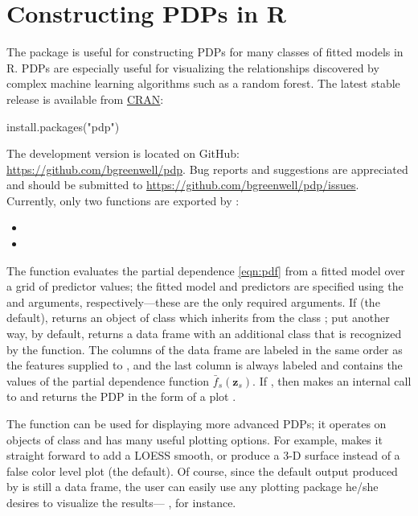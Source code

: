 \section{Constructing PDPs in R}
\label{sec:boston}

The  package is useful for constructing PDPs for many classes of fitted models in R. PDPs are especially useful for visualizing the relationships discovered by complex machine learning algorithms such as a random forest. The latest stable release is available from \href{https://cran.r-project.org/package=pdp}{CRAN}:
\begin{example}
install.packages("pdp")
\end{example}
The development version is located on GitHub: \url{https://github.com/bgreenwell/pdp}. Bug reports and suggestions are appreciated and should be submitted to \url{https://github.com/bgreenwell/pdp/issues}. Currently, only two functions are exported by :
\begin{itemize}
  \item {}
  \item {}
\end{itemize}

The  function evaluates the partial dependence \eqref{eqn:pdf} from a fitted model over a grid of predictor values; the fitted model and predictors are specified using the  and  arguments, respectively---these are the only required arguments. If  (the default),  returns an object of class  which inherits from the class ; put another way, by default,  returns a data frame with an additional class that is recognized by the  function. The columns of the data frame are labeled in the same order as the features supplied to , and the last column is always labeled  and contains the values of the partial dependence function $\bar{f}_s\left(\boldsymbol{z}_s\right)$. If , then  makes an internal call to  and returns the PDP in the form of a  plot \citep{lattice-pkg}.

The  function can be used for displaying more advanced PDPs; it operates on objects of class  and has many useful plotting options. For example,  makes it straight forward to add a LOESS smooth, or produce a 3-D surface instead of a false color level plot (the default). Of course, since the default output produced by  is still a data frame, the user can easily use any plotting package he/she desires to visualize the results--- \citep{ggplot2-pkg}, for instance.

